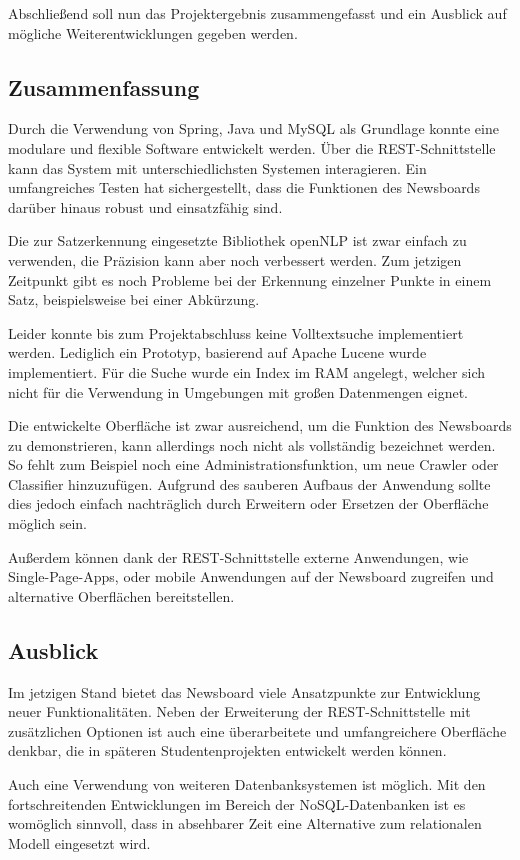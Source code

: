 Abschließend soll nun das Projektergebnis zusammengefasst und ein Ausblick auf mögliche
Weiterentwicklungen gegeben werden.

\subsection{Zusammenfassung}
Durch die Verwendung von Spring, Java und MySQL als Grundlage konnte eine modulare
und flexible Software entwickelt werden. Über die REST-Schnittstelle kann das System
mit unterschiedlichsten Systemen interagieren. Ein umfangreiches Testen hat sichergestellt,
dass die Funktionen des Newsboards darüber hinaus robust und einsatzfähig sind.

Die zur Satzerkennung eingesetzte Bibliothek openNLP ist zwar einfach zu
verwenden, die Präzision kann aber noch verbessert werden. Zum jetzigen Zeitpunkt gibt es 
noch Probleme bei der Erkennung einzelner Punkte in einem Satz, beispielsweise bei einer
Abkürzung.

Leider konnte bis zum Projektabschluss keine Volltextsuche implementiert werden. Lediglich
ein Prototyp, basierend auf Apache Lucene wurde implementiert. Für die Suche wurde ein Index
im RAM angelegt, welcher sich nicht für die Verwendung in Umgebungen mit großen Datenmengen
eignet.

Die entwickelte Oberfläche ist zwar ausreichend, um die Funktion des Newsboards
zu demonstrieren, kann allerdings noch nicht als vollständig bezeichnet werden.
So fehlt zum Beispiel noch eine Administrationsfunktion, um neue Crawler oder Classifier
hinzuzufügen. Aufgrund des sauberen Aufbaus der Anwendung sollte dies jedoch einfach
nachträglich durch Erweitern oder Ersetzen der Oberfläche möglich sein.

Außerdem können dank der REST-Schnittstelle externe Anwendungen, wie Single-Page-Apps,
oder mobile Anwendungen auf der Newsboard zugreifen und alternative Oberflächen bereitstellen.

\subsection{Ausblick} 
Im jetzigen Stand bietet das Newsboard viele Ansatzpunkte zur Entwicklung neuer 
Funktionalitäten. Neben der Erweiterung der REST-Schnittstelle mit zusätzlichen Optionen ist 
auch eine überarbeitete und umfangreichere Oberfläche denkbar, die in späteren 
Studentenprojekten entwickelt werden können.

Auch eine Verwendung von weiteren Datenbanksystemen ist möglich. Mit den fortschreitenden
Entwicklungen im Bereich der NoSQL-Datenbanken ist es womöglich sinnvoll, dass in
absehbarer Zeit eine Alternative zum relationalen Modell eingesetzt wird.

